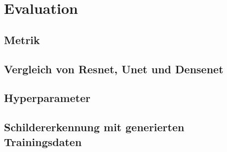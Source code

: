 \chapter{Evaluation}
\label{chap:Evaluation}

\section{Metrik}
\section{Vergleich von Resnet, Unet und Densenet}
\section{Hyperparameter}
\section{Schildererkennung mit generierten Trainingsdaten}